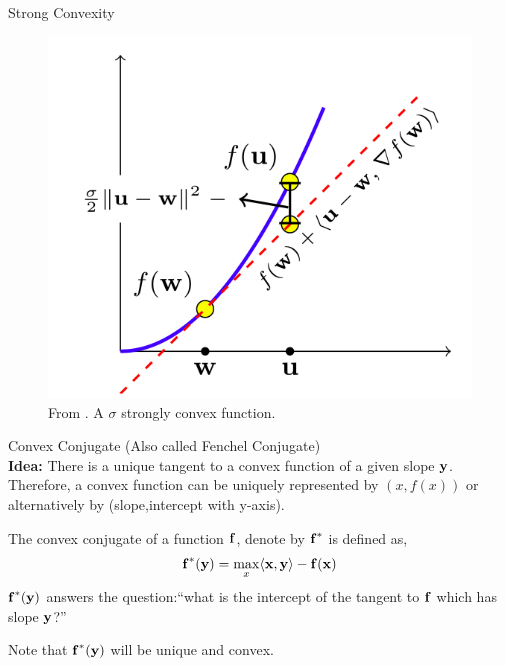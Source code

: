 \begin{frame}{Strong Convexity}
  \begin{figure}
    \includegraphics[scale=0.27]{images/str_convex.png}
    \caption{From \cite{ShSh2012}. A $\sigma$ strongly convex function.}
  \end{figure}
\end{frame}


\begin{frame}{Convex Conjugate}
  (Also called Fenchel Conjugate)\\
  {\bf Idea:} There is a unique tangent to a convex function of a given slope $\operatorname{\mathbf{y}}$. Therefore, a convex function can be uniquely represented by $(x,f(x))$ or alternatively by (slope,intercept with y-axis).
  \begin{definition}
    The convex conjugate of a function $\operatorname{\mathbf{f}}$, denote by ${\operatorname{\mathbf{f}}}^{*}$ is defined as,
    \begin{align*}
      {\operatorname{\mathbf{f}}}^{*}(\operatorname{\mathbf{y}}) = \max_x \langle {\operatorname{\mathbf{x}}} , {\operatorname{\mathbf{y}}} \rangle - \operatorname{\mathbf{f}}(\operatorname{\mathbf{x}})
    \end{align*}
    ${\operatorname{\mathbf{f}}}^{*}(\operatorname{\mathbf{y}})$ answers the question:``what is the intercept of the tangent to $\operatorname{\mathbf{f}}$ which has slope $\operatorname{\mathbf{y}}$?''
  \end{definition}
  Note that ${\operatorname{\mathbf{f}}}^{*}(\operatorname{\mathbf{y}})$ will be unique and convex.
\end{frame}


